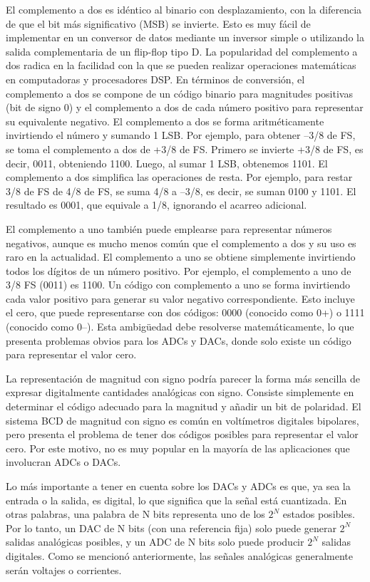     El complemento a dos es idéntico al binario con desplazamiento, con la diferencia de que el bit más significativo (MSB) se invierte. Esto es muy fácil de implementar en un conversor de datos mediante un inversor simple o utilizando la salida complementaria de un flip-flop tipo D. La popularidad del complemento a dos radica en la facilidad con la que se pueden realizar operaciones matemáticas en computadoras y procesadores DSP. En términos de conversión, el complemento a dos se compone de un código binario para magnitudes positivas (bit de signo 0) y el complemento a dos de cada número positivo para representar su equivalente negativo. El complemento a dos se forma aritméticamente invirtiendo el número y sumando 1 LSB. Por ejemplo, para obtener –3/8 de FS, se toma el complemento a dos de +3/8 de FS. Primero se invierte +3/8 de FS, es decir, 0011, obteniendo 1100. Luego, al sumar 1 LSB, obtenemos 1101. El complemento a dos simplifica las operaciones de resta. Por ejemplo, para restar 3/8 de FS de 4/8 de FS, se suma 4/8 a –3/8, es decir, se suman 0100 y 1101. El resultado es 0001, que equivale a 1/8, ignorando el acarreo adicional.

    El complemento a uno también puede emplearse para representar números negativos, aunque es mucho menos común que el complemento a dos y su uso es raro en la actualidad. El complemento a uno se obtiene simplemente invirtiendo todos los dígitos de un número positivo. Por ejemplo, el complemento a uno de 3/8 FS (0011) es 1100. Un código con complemento a uno se forma invirtiendo cada valor positivo para generar su valor negativo correspondiente. Esto incluye el cero, que puede representarse con dos códigos: 0000 (conocido como 0+) o 1111 (conocido como 0–). Esta ambigüedad debe resolverse matemáticamente, lo que presenta problemas obvios para los ADCs y DACs, donde solo existe un código para representar el valor cero.

    La representación de magnitud con signo podría parecer la forma más sencilla de expresar digitalmente cantidades analógicas con signo. Consiste simplemente en determinar el código adecuado para la magnitud y añadir un bit de polaridad. El sistema BCD de magnitud con signo es común en voltímetros digitales bipolares, pero presenta el problema de tener dos códigos posibles para representar el valor cero. Por este motivo, no es muy popular en la mayoría de las aplicaciones que involucran ADCs o DACs.


    Lo más importante a tener en cuenta sobre los DACs y ADCs es que, ya sea la entrada o la salida, es digital, lo que significa que la señal está cuantizada. En otras palabras, una palabra de N bits representa uno de los $2^N$ estados posibles. Por lo tanto, un DAC de N bits (con una referencia fija) solo puede generar $2^N$ salidas analógicas posibles, y un ADC de N bits solo puede producir $2^N$ salidas digitales. Como se mencionó anteriormente, las señales analógicas generalmente serán voltajes o corrientes.

